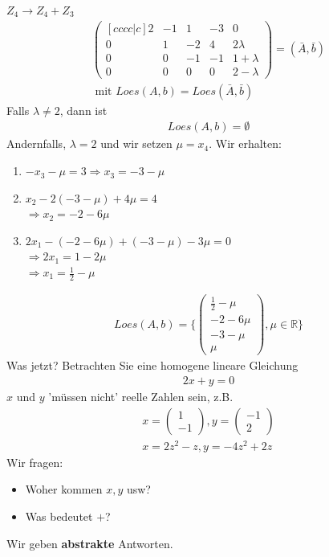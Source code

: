 \documentclass[11pt]{report}
\newcommand*\Zb[1] {\mathbb{#1}}
\newcommand*\f[1] {\textbf{#1}}
\begin{document}
$Z_4 \rightarrow Z_4 + Z_3$
\begin{align}
\begin{pmatrix}[cccc|c]
 2 & -1 & 1 & -3 & 0\\
 0 & 1 & -2 & 4 & 2\lambda \\
 0 & 0 & -1 & -1 & 1+\lambda \\
 0 & 0 & 0 & 0 & 2-\lambda
\end{pmatrix}=(\bar{A}, \bar{b}) \\ 
\text{ mit } Loes(A, b)=Loes(\bar{A}, \bar{b})
\end{align}
Falls $\lambda \neq 2$, dann ist
\begin{align}
 Loes(A, b) = \emptyset
\end{align}
Andernfalls, $\lambda = 2$ und wir setzen $\mu=x_4$.
Wir erhalten:
\begin{enumerate}
 \item $-x_3-\mu = 3 \Rightarrow x_3 = -3 -\mu$
 \item $x_2 - 2(-3-\mu) + 4 \mu = 4$ \\ $\Rightarrow x_2 = -2 -6\mu$
 \item $2x_1-(-2-6\mu) + (-3-\mu) - 3\mu = 0$ \\ $\Rightarrow 2x_1 = 1-2\mu$ \\ $\Rightarrow x_1 = \frac{1}{2}-\mu$
\end{enumerate}
\begin{align}
Loes(A, b) = \{
\begin{pmatrix}
 \frac{1}{2}-\mu \\
 -2-6\mu \\
 -3-\mu \\
 \mu 
\end{pmatrix}, \mu \in \Zb{R}\} 
\end{align}
Was jetzt? Betrachten Sie eine homogene lineare Gleichung
\begin{align}
 2x + y = 0
\end{align}
$x$ und $y$ 'müssen nicht' reelle Zahlen sein, z.B.
\begin{align}
x = \begin{pmatrix}
 1 \\
 -1 
\end{pmatrix}, y = \begin{pmatrix}
 -1 \\
 2 
\end{pmatrix} \\
x = 2z^2-z, y=-4z^2+2z
\end{align}
Wir fragen:
\begin{itemize}
 \item Woher kommen $x, y$ usw?
 \item Was bedeutet $+$?
\end{itemize}
Wir geben \f{abstrakte} Antworten.
\end{document}

